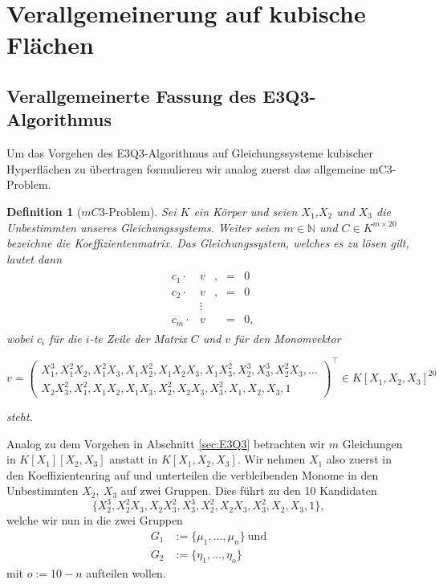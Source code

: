 \documentclass[a4paper,oneside, 11pt, openany%
]{article}
\newcommand{\N}{{\mathbb N}}
\newcommand{\coloneqq}{:=}
\theoremstyle{custom}
\theoremstyle{custom}
\newtheorem{definition}[theorem]{Definition}
\begin{document}
	\newpage
\section{Verallgemeinerung auf kubische Flächen}\label{chp:5C3}
\subsection{Verallgemeinerte Fassung des E3Q3-Algorithmus}\label{sec:mC3}
Um das Vorgehen des E3Q3-Algorithmus auf Gleichungssysteme kubischer Hyperflächen zu übertragen formulieren wir analog zuerst das allgemeine mC3-Problem.

\begin{definition}[$mC3$-Problem]\label{def:mC3}
	Sei $K$ ein Körper und seien $X_1$,$X_{2}$ und $X_{3}$ die Unbestimmten unseres Gleichungssystems. Weiter seien $m \in \N$ und $C \in K^{m\times 20}$ bezeichne die Koeffizientenmatrix. Das Gleichungssystem, welches es zu lösen gilt, lautet dann
	\begin{gather}\label{eqn:mC3}
		\begin{alignedat}{5}
			& c_{1} \cdot &v&,
			&=&0\\
			& c_{2} \cdot &v&,
			&=&0\\
			&&\vdots&&&\\
			& c_{m} \cdot &v&
			&=&0,
		\end{alignedat}
	\end{gather}
	wobei $c_{i}$ für die $i$-te Zeile der Matrix $C$ und $v$ für den Monomvektor 

\begin{equation*}
v = 	
	\begin{pmatrix}
			   X_{1}^3,X_{1}^2X_{2},X_{1}^2X_{3},X_{1}X_{2}^2,X_{1}X_{2}X_{3},X_{1}X_{3}^2,X_{2}^3,X_{3}^3,X_{2}^2X_{3},\ldots \\
		  X_{2}X_{3}^2,X_{1}^2,X_{1}X_{2},X_{1}X_{3},X_{2}^2,X_{2}X_{3},X_{3}^2,X_{1},X_{2},X_{3},1
\end{pmatrix}
^{\top} \in K[X_1,X_2,X_3]^{20}
\end{equation*}

	steht.
\end{definition}
Analog zu dem Vorgehen in Abschnitt \ref{sec:E3Q3} betrachten wir $m$ Gleichungen in $K\left[ X_{1}\right] \left[X_{2},X_{3}\right] $ anstatt in $K\left[ X_{1},X_{2},X_{3}\right]$. Wir nehmen $X_{1}$ also zuerst in den Koeffizientenring auf und unterteilen die verbleibenden Monome in den Unbestimmten $X_{2},\ X_{3}$ auf zwei Gruppen.
Dies führt zu den 10 Kandidaten 
\begin{equation}
	\{X_{2}^3,X_{2}^2X_{3},X_{2}X_{3}^2,X_{3}^3,X_{2}^2,X_{2}X_{3},X_{3}^2,X_{2},X_{3},1\},
\end{equation}
welche wir nun in die zwei Gruppen 
\begin{equation}\label{eqn:mC3grp}
	\begin{alignedat}{1}
	G_1 &\coloneqq \{\mu_1,\ldots,\mu_n\} \ \text{und} \\
	G_2 &\coloneqq \{\eta_1,\ldots,\eta_{o}\}
\end{alignedat}
\end{equation}
mit $o\coloneqq 10 - n$ aufteilen wollen.
\end{document}
